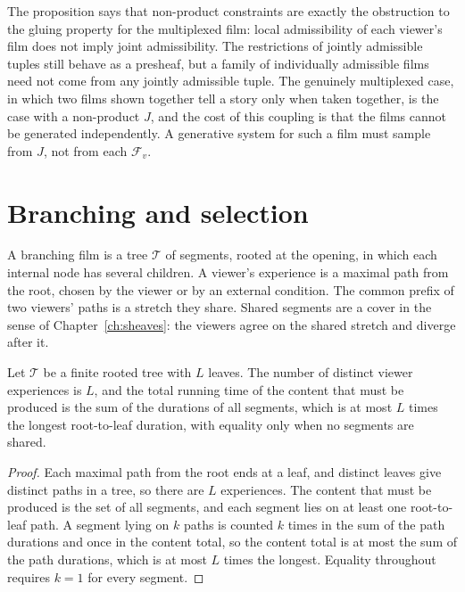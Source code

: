 The proposition says that non-product constraints are exactly the obstruction to the gluing property for the multiplexed film: local admissibility of each viewer's film does not imply joint admissibility. The restrictions of jointly admissible tuples still behave as a presheaf, but a family of individually admissible films need not come from any jointly admissible tuple. The genuinely multiplexed case, in which two films shown together tell a story only when taken together, is the case with a non-product $J$, and the cost of this coupling is that the films cannot be generated independently. A generative system for such a film must sample from $J$, not from each $\mathcal{F}_v$.

\section{Branching and selection}

A branching film is a tree $\mathcal{T}$ of segments, rooted at the opening, in which each internal node has several children. A viewer's experience is a maximal path from the root, chosen by the viewer or by an external condition. The common prefix of two viewers' paths is a stretch they share. Shared segments are a cover in the sense of Chapter~\ref{ch:sheaves}: the viewers agree on the shared stretch and diverge after it.

\begin{proposition}\label{prop:branching}
Let $\mathcal{T}$ be a finite rooted tree with $L$ leaves. The number of distinct viewer experiences is $L$, and the total running time of the content that must be produced is the sum of the durations of all segments, which is at most $L$ times the longest root-to-leaf duration, with equality only when no segments are shared.
\end{proposition}

\begin{proof}
Each maximal path from the root ends at a leaf, and distinct leaves give distinct paths in a tree, so there are $L$ experiences. The content that must be produced is the set of all segments, and each segment lies on at least one root-to-leaf path. A segment lying on $k$ paths is counted $k$ times in the sum of the path durations and once in the content total, so the content total is at most the sum of the path durations, which is at most $L$ times the longest. Equality throughout requires $k=1$ for every segment.
\end{proof}

